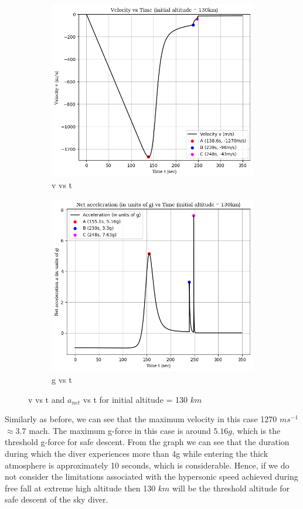 \documentclass[a4paper, 14pt]{extarticle}
\begin{document}
\begin{figure}[ht]
  \begin{subfigure}{0.5\textwidth}
    \includegraphics[width=\linewidth]{130-2}
    \caption{v vs t}
  \end{subfigure}
  \hfill
  \begin{subfigure}{0.5\textwidth}
    \includegraphics[width=\linewidth]{130-3}
    \caption{g vs t}
  \end{subfigure}
  \caption{v vs t and $a_{net}$ vs t for initial altitude = 130 $km$}
\end{figure}
Similarly as before, we can see that the maximum velocity in this case 1270 $ms^{-1} $$\approx3.7$ mach. The maximum g-force in this case is around $5.16g$, which is the threshold g-force for safe descent. From the graph we can see that the duration during which the diver experiences more than 4g while entering the thick atmosphere is approximately 10 seconds, which is considerable. Hence, if we do not consider the limitations associated with the hypersonic speed achieved during free fall at extreme high altitude then 130 $km$ will be the threshold altitude for safe descent of the sky diver.
\end{document}
